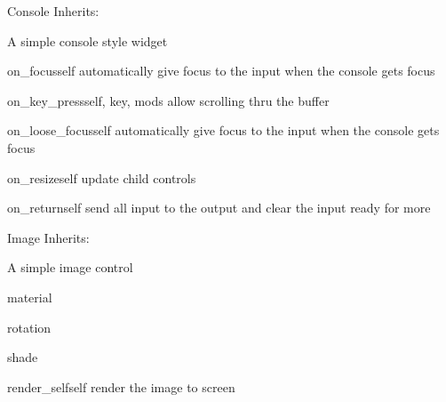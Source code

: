 \begin{classdesc*}{Console}
Inherits:

A simple console style widget

\begin{methoddesc}{on_focus}{self}
automatically give focus to the input when the console gets focus
\end{methoddesc}

\begin{methoddesc}{on_key_press}{self, key, mods}
allow scrolling thru the buffer
\end{methoddesc}

\begin{methoddesc}{on_loose_focus}{self}
automatically give focus to the input when the console gets focus
\end{methoddesc}

\begin{methoddesc}{on_resize}{self}
update child controls
\end{methoddesc}

\begin{methoddesc}{on_return}{self}
send all input to the output and clear the input ready for more
\end{methoddesc}

\end{classdesc*}

\begin{classdesc*}{Image}
Inherits:

A simple image control

\begin{memberdesc}{material}

\end{memberdesc}

\begin{memberdesc}{rotation}

\end{memberdesc}

\begin{memberdesc}{shade}

\end{memberdesc}

\begin{methoddesc}{render_self}{self}
render the image to screen
\end{methoddesc}

\end{classdesc*}

